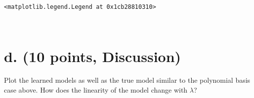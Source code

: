 \documentclass[11pt]{article}
\makeatletter
\newcommand{\boxspacing}{\kern\kvtcb@left@rule\kern\kvtcb@boxsep}
\newcommand{\prompt}[4]{
        {\ttfamily\llap{{\color{#2}[#3]:\hspace{3pt}#4}}\vspace{-\baselineskip}}
    }
\makeatother
\begin{document}
            \begin{tcolorbox}[breakable, size=fbox, boxrule=.5pt, pad at break*=1mm, opacityfill=0]
\prompt{Out}{outcolor}{16}{\boxspacing}
\begin{Verbatim}[commandchars=\\\{\}]
<matplotlib.legend.Legend at 0x1cb28810310>
\end{Verbatim}
\end{tcolorbox}
        
    \begin{center}
    \end{center}
    { \hspace*{\fill} \\}
    
    \hypertarget{d.-10-points-discussion}{%
\section{\texorpdfstring{\textbf{d}. (10 points,
\textbf{Discussion})}{d. (10 points, Discussion)}}\label{d.-10-points-discussion}}

Plot the learned models as well as the true model similar to the
polynomial basis case above. How does the linearity of the model change
with \(\lambda\)?
\end{document}
